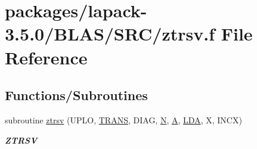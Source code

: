 \hypertarget{lapack-3_85_80_2BLAS_2SRC_2ztrsv_8f}{}\section{packages/lapack-\/3.5.0/\+B\+L\+A\+S/\+S\+R\+C/ztrsv.f File Reference}
\label{lapack-3_85_80_2BLAS_2SRC_2ztrsv_8f}
\subsection*{Functions/\+Subroutines}
\begin{DoxyCompactItemize}
\item 
subroutine \hyperlink{group__complex16__blas__level2_ga99cc66f0833474d6607e6ea7dbe2f9bd}{ztrsv} (U\+P\+L\+O, \hyperlink{superlu__enum__consts_8h_a0c4e17b2d5cea33f9991ccc6a6678d62a1f61e3015bfe0f0c2c3fda4c5a0cdf58}{T\+R\+A\+N\+S}, D\+I\+A\+G, \hyperlink{polmisc_8c_a0240ac851181b84ac374872dc5434ee4}{N}, \hyperlink{classA}{A}, \hyperlink{example__user_8c_ae946da542ce0db94dced19b2ecefd1aa}{L\+D\+A}, X, I\+N\+C\+X)
\begin{DoxyCompactList}\small\item\em {\bfseries Z\+T\+R\+S\+V} \end{DoxyCompactList}\end{DoxyCompactItemize}
